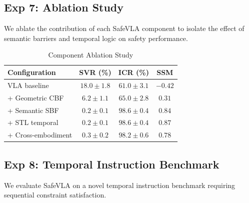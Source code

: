 \documentclass[conference]{IEEEtran}
\begin{document}
\subsection{Exp 7: Ablation Study}
We ablate the contribution of each SafeVLA component to isolate the effect of semantic barriers and temporal logic on safety performance.

\begin{table}[h]
\centering
\caption{Component Ablation Study}
\begin{tabular}{lccc}
\toprule
\textbf{Configuration} & \textbf{SVR (\%)} & \textbf{ICR (\%)} & \textbf{SSM} \\
\midrule
VLA baseline & $18.0 \pm 1.8$ & $61.0 \pm 3.1$ & $-0.42$ \\
+ Geometric CBF & $6.2 \pm 1.1$ & $65.0 \pm 2.8$ & $0.31$ \\
+ Semantic SBF & $0.2 \pm 0.1$ & $98.6 \pm 0.4$ & $0.84$ \\
+ STL temporal & $0.2 \pm 0.1$ & $98.6 \pm 0.4$ & $0.87$ \\
+ Cross-embodiment & $0.3 \pm 0.2$ & $98.2 \pm 0.6$ & $0.78$ \\
\bottomrule
\end{tabular}
\end{table}

\subsection{Exp 8: Temporal Instruction Benchmark}
We evaluate SafeVLA on a novel temporal instruction benchmark requiring sequential constraint satisfaction.
\end{document}
